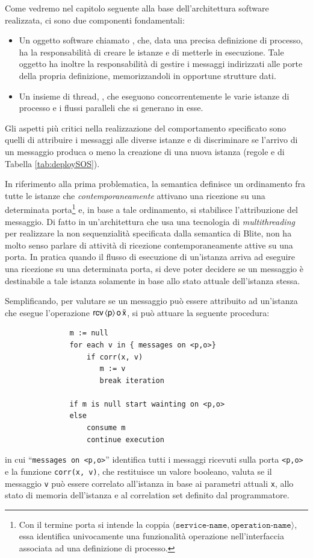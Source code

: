 Come vedremo nel capitolo seguente alla base dell'architettura software
realizzata, ci sono due componenti fondamentali:

\begin{itemize}
  \item Un oggetto software chiamato , che, data una   
  precisa definizione di processo, ha la responsabilità di creare le istanze
  e di metterle in esecuzione. Tale oggetto ha inoltre la responsabilità di
  gestire i messaggi indirizzati alle porte
  della propria definizione, memorizzandoli in opportune strutture dati.
  \item Un insieme di thread, , che eseguono concorrentemente
  le varie istanze di processo e i flussi paralleli che si generano in esse.
\end{itemize}

Gli aspetti più critici nella realizzazione del comportamento specificato
sono quelli di attribuire i messaggi alle diverse istanze e di discriminare se
l'arrivo di un messaggio produca o meno la creazione di una nuova
istanza (regole  e  di Tabella
\ref{tab:deploySOS}).

In riferimento alla prima problematica, la semantica definisce un ordinamento
fra tutte le istanze che \emph{contemporaneamente} attivano una ricezione su una
determinata porta\footnote{Con il termine porta si intende la coppia $\langle
\texttt{service-name}, \texttt{operation-name} \rangle$, essa identifica
univocamente una funzionalità operazione nell'interfaccia associata ad una
definizione di processo.} e, in base a tale ordinamento, si stabilisce
l'attribuzione del messaggio. Di fatto in un'architettura che
usa una tecnologia di \emph{multithreading} per realizzare la non sequenzialità
specificata dalla semantica di Blite, non ha molto senso parlare di attività di
ricezione contemporaneamente attive su una porta. In pratica quando il
flusso di esecuzione di un'istanza arriva ad eseguire una ricezione su una
determinata porta, si deve poter decidere se un messaggio è
destinabile a tale istanza solamente in base allo stato attuale dell'istanza
stessa.

Semplificando, per valutare se un messaggio può essere attribuito ad un'istanza
che esegue l'operazione ${\sf rcv}\,\langle {\sf p} \rangle\, {\sf o}\, \bar{{\sf x}}$, si può attuare la
seguente procedura:

\begin{verbatim}
               m := null
               for each v in { messages on <p,o>} 
                   if corr(x, v) 
                      m := v
                      break iteration
    
               if m is null start wainting on <p,o>
               else 
                   consume m
                   continue execution
\end{verbatim}
in cui ``\texttt{messages on <p,o>}'' identifica tutti i
messaggi ricevuti sulla porta \texttt{<p,o>} e la funzione \texttt{corr(x, v)},
che restituisce un valore booleano, valuta se il messaggio \texttt{v} può essere correlato all'istanza in
base ai parametri attuali \texttt{x}, allo stato di memoria dell'istanza e al
correlation set definito dal programmatore.

